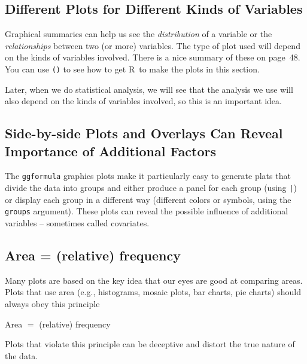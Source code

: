 \documentclass[twoside]{book}\usepackage[]{graphicx}\usepackage[]{xcolor}
\newcommand{\Rindex}[1]{\index{\texttt{#1}}}
\newcommand{\function}[1]{{\color{purple!75!blue}\texttt{\StrSubstitute{#1}{()}{}()}}\Rindex{#1}}
\newcommand{\argument}[1]{{\color{brown!80!black}\texttt{#1}}}
\newcommand{\pkg}[1]{{\color{red!80!black}\texttt{#1}}\Rindex{#1}}
\def\R{{\sf R}}
\begin{document}
\subsection{Different Plots for Different Kinds of Variables}
Graphical summaries can help us see the \emph{distribution} of a variable 
or the \emph{relationships} between two (or more) variables.  The type of plot
used will depend on the kinds of variables involved.
There is a nice summary of these on page~48.  You can use \function{demo()} to see how
to get \R\ to make the plots in this section.

Later, when we do statistical analysis, we will see that the analysis we use will 
also depend on the kinds of variables involved, so this is an important idea.

\subsection{Side-by-side Plots and Overlays Can Reveal Importance of Additional Factors}
The \pkg{ggformula} graphics plots make it particularly easy to generate plats that 
divide the data into groups and either produce a panel for each group (using \verb!|!)
or display each group in a different way (different colors or symbols, using 
the \argument{groups} argument).  These plots can reveal the 
possible influence of additional variables -- sometimes called covariates.

\subsection{Area = (relative) frequency}

Many plots are based on the key idea that our eyes are good at comparing areas.  Plots 
that use area (e.g., histograms, mosaic plots, bar charts, pie charts) should always obey
this principle
\begin{center}
\large
Area $ = $ (relative) frequency
\end{center}
Plots that violate this principle can be deceptive and distort the true nature
of the data.  
\end{document}

